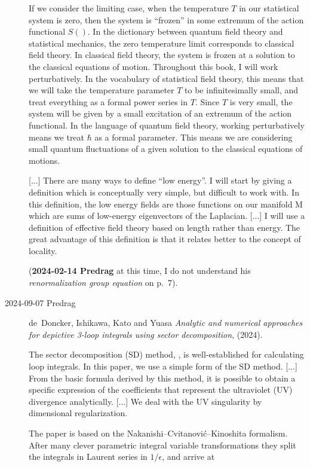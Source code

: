 \begin{description}
If we consider the limiting case, when the temperature $T$ in our statistical
system is zero, then the system is ``frozen'' in some extremum of the
action functional $S( )$. In the dictionary between quantum field theory and
statistical mechanics, the zero temperature limit corresponds to classical
field theory. In classical field theory, the system is frozen at a solution to
the classical equations of motion.
Throughout this book, I will work perturbatively. In the vocabulary
of statistical field theory, this means that we will take the temperature
parameter $T$ to be infinitesimally small, and treat everything as a formal
power series in $T$. Since $T$ is very small, the system will be given by a small
excitation of an extremum of the action functional.
In the language of quantum field theory, working perturbatively means
we treat $\hbar$ as a formal parameter. This means we are considering small
quantum fluctuations of a given solution to the classical equations of motions.

[...]
There are many ways to define ``low energy''. I will start by giving a
definition which is conceptually very simple, but difficult to work with. In
this definition, the low energy fields are those functions on our manifold M
which are sums of low-energy eigenvectors of the Laplacian.
[...]
I will use a definition of effective field theory
based on length rather than energy. The great advantage of this definition
is that it relates better to the concept of locality.

(\textbf{2024-02-14 Predrag} at this time, I do not understand his
\emph{renormalization group equation} on p.~7).

\item[2024-09-07 Predrag]
{de Doncker}, Ishikawa,  Kato and Yuasa
{\em Analytic and numerical approaches for depictive 3-loop integrals
using sector decomposition}, (2024).

The sector decomposition (SD) method,   %
,
is well-established for calculating loop integrals.
In this paper, we use a simple form of the SD method.
[...]
From the basic formula derived by this method, it is possible to obtain a specific
expression of the coefficients that represent the ultraviolet (UV) divergence analytically.
[...]
We deal with the UV singularity by dimensional regularization.

The paper is based on the Nakanishi–Cvitanovi{\'c}–Kinoshita
formalism.
After many clever parametric integral variable transformations they
split the integrals in Laurent series in $1/\epsilon$, and arrive at



\end{description}
